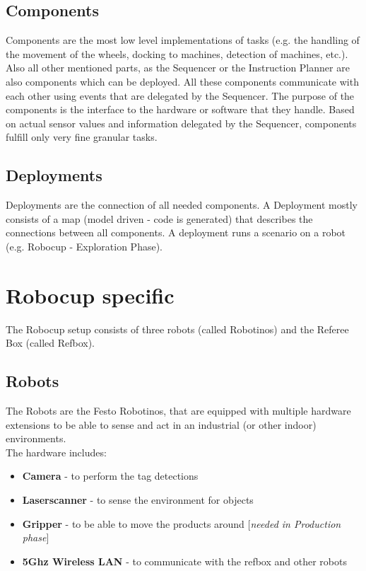 \subsection{Components}
Components are the most low level implementations of tasks (e.g. the handling of the movement of the wheels, docking to machines, detection of machines, etc.).
Also all other mentioned parts, as the Sequencer or the Instruction Planner are also components which can be deployed.
All these components communicate with each other using events that are delegated by the Sequencer.
The purpose of the components is the interface to the hardware or software that they handle.
Based on actual sensor values and information delegated by the Sequencer, components fulfill only very fine granular tasks.

\subsection{Deployments}
\label{subsec:Deployments}
Deployments are the connection of all needed components.
A Deployment mostly consists of a map (model driven - code is generated) that describes the connections between all components.
A deployment runs a scenario on a robot (e.g. Robocup - Exploration Phase).

\section{Robocup specific}
The Robocup setup consists of three robots (called Robotinos) and the Referee Box (called Refbox).

\subsection{Robots}
The Robots are the Festo Robotinos, that are equipped with multiple hardware extensions to be able to sense and act
in an industrial (or other indoor) environments.\\
The hardware includes:
\begin{itemize}
    \item \textbf{Camera} - to perform the tag detections
    \item \textbf{Laserscanner} - to sense the environment for objects
    \item \textbf{Gripper} - to be able to move the products around [\textit{needed in Production phase}]
    \item \textbf{5Ghz Wireless LAN} - to communicate with the refbox and other robots
\end{itemize}

